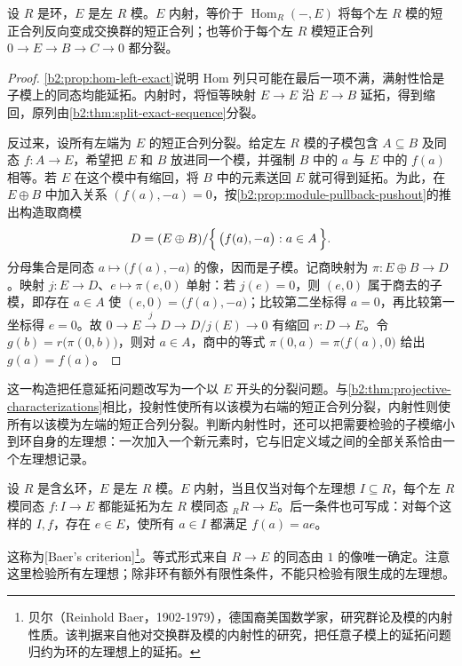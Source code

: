 \begin{proposition}\label{b2:prop:injective-characterizations}
	设 \(R\) 是环，\(E\) 是左 \(R\) 模。\(E\) 内射，等价于 \(\operatorname{Hom}_R(-,E)\) 将每个左 \(R\) 模的短正合列反向变成交换群的短正合列；也等价于每个左 \(R\) 模短正合列 \(0\to E\to B\to C\to0\) 都分裂。
\end{proposition}
\begin{proof}
	\cref{b2:prop:hom-left-exact}说明 Hom 列只可能在最后一项不满，满射性恰是子模上的同态均能延拓。内射时，将恒等映射 \(E\to E\) 沿 \(E\to B\) 延拓，得到缩回，原列由\cref{b2:thm:split-exact-sequence}分裂。

	反过来，设所有左端为 \(E\) 的短正合列分裂。给定左 \(R\) 模的子模包含 \(A\subseteq B\) 及同态 \(f:A\to E\)，希望把 \(E\) 和 \(B\) 放进同一个模，并强制 \(B\) 中的 \(a\) 与 \(E\) 中的 \(f(a)\) 相等。若 \(E\) 在这个模中有缩回，将 \(B\) 中的元素送回 \(E\) 就可得到延拓。为此，在 \(E\oplus B\) 中加入关系 \((f(a),-a)=0\)，按\cref{b2:prop:module-pullback-pushout}的推出构造取商模
	\[
		D=(E\oplus B)/\Bigl\{\,\bigl(f(a),-a\bigr):a\in A\,\Bigr\}.
	\]
	分母集合是同态 \(a\mapsto\bigl(f(a),-a\bigr)\) 的像，因而是子模。记商映射为 \(\pi:E\oplus B\to D\)。映射 \(j:E\to D\)、\(e\mapsto\pi(e,0)\) 单射：若 \(j(e)=0\)，则 \((e,0)\) 属于商去的子模，即存在 \(a\in A\) 使 \((e,0)=\bigl(f(a),-a\bigr)\)；比较第二坐标得 \(a=0\)，再比较第一坐标得 \(e=0\)。故 \(0\to E\xrightarrow{j}D\to D/j(E)\to0\) 有缩回 \(r:D\to E\)。令 \(g(b)=r\bigl(\pi(0,b)\bigr)\)，则对 \(a\in A\)，商中的等式 \(\pi(0,a)=\pi\bigl(f(a),0\bigr)\) 给出 \(g(a)=f(a)\)。
\end{proof}

这一构造把任意延拓问题改写为一个以 \(E\) 开头的分裂问题。与\cref{b2:thm:projective-characterizations}相比，投射性使所有以该模为右端的短正合列分裂，内射性则使所有以该模为左端的短正合列分裂。判断内射性时，还可以把需要检验的子模缩小到环自身的左理想：一次加入一个新元素时，它与旧定义域之间的全部关系恰由一个左理想记录。

\begin{theorem}[Baer 判据]\label{b2:thm:baer-criterion}
	设 \(R\) 是含幺环，\(E\) 是左 \(R\) 模。\(E\) 内射，当且仅当对每个左理想 \(I\subseteq R\)，每个左 \(R\) 模同态 \(f:I\to E\) 都能延拓为左 \(R\) 模同态 \({}_RR\to E\)。后一条件也可写成：对每个这样的 \(I,f\)，存在 \(e\in E\)，使所有 \(a\in I\) 都满足 \(f(a)=ae\)。
\end{theorem}

这称为[Baer's criterion]\footnote{贝尔（Reinhold Baer，1902-1979），德国裔美国数学家，研究群论及模的内射性质。该判据来自他对交换群及模的内射性的研究，把任意子模上的延拓问题归约为环的左理想上的延拓。}。等式形式来自 \(R\to E\) 的同态由 \(1\) 的像唯一确定。注意这里检验所有左理想；除非环有额外有限性条件，不能只检验有限生成的左理想。

